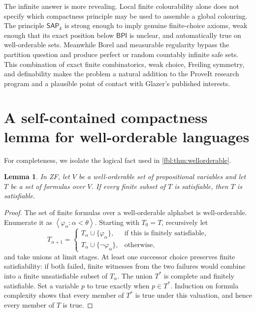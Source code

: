 \documentclass[11pt]{article}
\newtheorem{lemma}[theorem]{Lemma}
\theoremstyle{definition}
\theoremstyle{remark}
\newcommand{\BPI}{\mathsf{BPI}}
\newcommand{\SAP}{\mathsf{SAP}}
\newcommand{\angles}[1]{\left\langle#1\right\rangle}
\begin{document}
The infinite answer is more revealing.  Local finite colourability alone
does not specify which compactness principle may be used to assemble a
global colouring.  The principle $\SAP_k$ is strong enough to imply genuine
finite-choice axioms, weak enough that its exact position below $\BPI$ is
unclear, and automatically true on well-orderable sets.  Meanwhile Borel and
measurable regularity bypass the partition question and produce perfect or
random countably infinite safe sets.  This combination of exact finite
combinatorics, weak choice, Freiling symmetry, and definability makes the
problem a natural addition to the ProveIt research program and a plausible
point of contact with Glazer's published interests.

\appendix

\section{A self-contained compactness lemma for well-orderable languages}

For completeness, we isolate the logical fact used in
\cref{fbl:thm:wellorderable}.

\begin{lemma}\label{fbl:lem:wellordered-compactness}
In ZF, let $V$ be a well-orderable set of propositional variables and let
$T$ be a set of formulas over $V$.  If every finite subset of $T$ is
satisfiable, then $T$ is satisfiable.
\end{lemma}

\begin{proof}
The set of finite formulas over a well-orderable alphabet is well-orderable.
Enumerate it as $\angles{\varphi_\alpha:\alpha<\theta}$.  Starting with
$T_0=T$, recursively let
\[
 T_{\alpha+1}=
 \begin{cases}
 T_\alpha\cup\{\varphi_\alpha\},&
    \text{if this is finitely satisfiable},\\
 T_\alpha\cup\{\neg\varphi_\alpha\},&\text{otherwise},
 \end{cases}
\]
and take unions at limit stages.  At least one successor choice preserves
finite satisfiability: if both failed, finite witnesses from the two failures
would combine into a finite unsatisfiable subset of $T_\alpha$.  The union
$T^*$ is complete and finitely satisfiable.  Set a variable $p$ to true
exactly when $p\in T^*$.  Induction on formula complexity shows that every
member of $T^*$ is true under this valuation, and hence every member of $T$
is true.
\end{proof}
\end{document}
